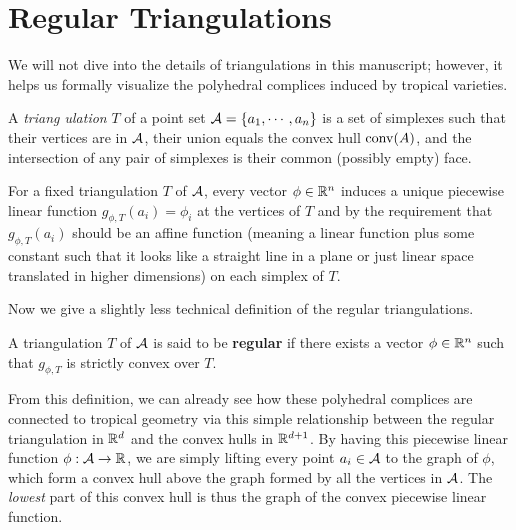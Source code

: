 \section{Regular Triangulations}
\label{sec:regular-trangulations}
    We will not dive into the details of triangulations in this manuscript; however, it helps us formally visualize the polyhedral complices induced by tropical varieties. 
	\begin{definition}[Triangulation]
		A \emph{triang
		ulation} $T$ of a point set 
		$\mathcal{A} = \{a_1,\cdots,a_n\}$ is a set of simplexes 
		such that their vertices are in $\mathcal{A}$, 
		their union equals the convex hull $\operatorname{conv}(A)$, 
		and the intersection of any pair of simplexes 
		is their common (possibly empty) face.
	\end{definition}
	
	For a fixed triangulation $T$ of $\mathcal{A}$,
	every vector $\phi \in \mathbb{R}^n$ induces a unique piecewise linear 
	function $g_{\phi, T}(a_i) = \phi_i$ 
	at the vertices of $T$
	and by the requirement that 
	$g_{\phi, T}(a_i)$ should be an affine function 
	(meaning a linear function plus some constant
	such that it looks like a straight line in a plane
	or just linear space translated in higher dimensions)
	on each simplex of $T$.
	
	Now we give a slightly less technical definition of the regular 
	triangulations.
	\begin{definition}
		A triangulation $T$ of $\mathcal{A}$ is said to be \textbf{regular}
		if there exists a vector $\phi \in \mathbb{R}^n$ 
		such that $g_{\phi, T}$ is strictly convex over $T$.
	\end{definition}
	
	From this definition,
	we can already see how these polyhedral complices are 
	connected to tropical geometry
	via this simple relationship between 
	the regular triangulation in $\mathbb{R}^d$ 
	and the convex hulls in $\mathbb{R}^{d+1}$.
	By having this piecewise linear function 
	$\phi: \mathcal{A} \rightarrow \mathbb{R}$,
	we are simply lifting every point $a_i \in \mathcal{A}$ 
	to the graph of $\phi$,
	which form a convex hull above the graph formed by 
	all the vertices in $\mathcal{A}$. 
	The \emph{lowest} part of this convex hull 
	is thus the graph of the convex piecewise linear function.